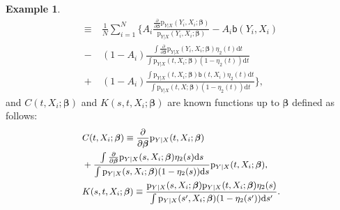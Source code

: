 \documentclass{article}
\def\sfb{\mathsf{b}}
\def\sfb{\mathsf{b}}
\theoremstyle{plain}
\theoremstyle{definition}
\newtheorem{example}[theorem]{Example}
\theoremstyle{remark}
\def\diff{\mathrm{d}}
\def\bbeta{\boldsymbol{\beta}}
\def\hat{\widehat}
\def\p{\mathrm{p}}
\begin{document}
\begin{example}
\begin{align*}
\equiv & \ \frac{1}{N} \sum_{i = 1}^{N} \Bigg\{ 
 A_i \frac{\frac{\partial}{\partial \bbeta} \p_{Y | X} (Y_i, X_{i}; \bbeta)}{\p_{Y | X} (Y_i, X_{i}; \bbeta)} - A_{i} \sfb (Y_{i}, X_{i})  \\ 
- & \ (1-A_i)\frac{\int \frac{\partial}{\partial \bbeta} \p_{Y | X} (Y_i, X_{i}; \bbeta) \eta_{2} (t) \diff t}{\int \p_{Y | X} (t, X_i; \bbeta) (1 - \eta_{2} (t)) \diff t} \\
 + & \ (1 - A_{i}) \frac{\int \p_{Y | X} (t, X_{i}; \bbeta) \sfb (t, X_{i}) \eta_{2} (t) \diff t}{\int \p_{Y | X} (t, X; \bbeta) (1 - \eta_{2} (t)) \diff t}  \Bigg\},
\end{align*}
and $C (t, X_i; \bbeta)$ and $K (s, t, X_i; \bbeta)$ are known functions up to $\bbeta$ defined as follows:
\begin{equation*}
\small
\begin{split}
& C (t,X_i; \bbeta) \equiv \frac{\partial}{\partial \bbeta} \p_{Y | X} (t,X_i; \bbeta) \\ 
  & + \frac {\int \frac{\partial}{\partial \bbeta} \p_{Y | X} (s, X_i; \bbeta) \eta_{2} (s) \diff s} {\int \p_{Y | X} (s, X_i; \bbeta) (1 - \eta_{2} (s)) \diff s} \p_{Y | X} (t,X_i; \bbeta),\\
& K (s,t, X_i; \bbeta) \equiv \frac{\p_{Y | X} (s, X_i; \bbeta) \p_{Y | X} (t,X_i; \bbeta) \eta_{2} (s)}{\int \p_{Y | X} (s', X_i; \bbeta) (1 - \eta_{2} (s')) \diff s'}.
\end{split}
\end{equation*}

\end{example}
\end{document}
